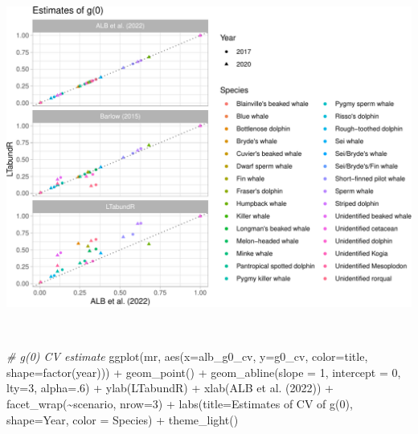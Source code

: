 \documentclass[
]{book}
\newenvironment{Shaded}{\begin{snugshade}}{\end{snugshade}}
\newcommand{\AttributeTok}[1]{\textcolor[rgb]{0.77,0.63,0.00}{#1}}
\newcommand{\CommentTok}[1]{\textcolor[rgb]{0.56,0.35,0.01}{\textit{#1}}}
\newcommand{\DecValTok}[1]{\textcolor[rgb]{0.00,0.00,0.81}{#1}}
\newcommand{\FunctionTok}[1]{\textcolor[rgb]{0.00,0.00,0.00}{#1}}
\newcommand{\NormalTok}[1]{#1}
\newcommand{\SpecialCharTok}[1]{\textcolor[rgb]{0.00,0.00,0.00}{#1}}
\newcommand{\StringTok}[1]{\textcolor[rgb]{0.31,0.60,0.02}{#1}}
\begin{document}
\includegraphics{figures/unnamed-chunk-388-1.pdf}

~

\begin{Shaded}
\begin{Highlighting}[]
\CommentTok{\# g(0) CV estimate}
\FunctionTok{ggplot}\NormalTok{(mr,}
       \FunctionTok{aes}\NormalTok{(}\AttributeTok{x=}\NormalTok{alb\_g0\_cv, }\AttributeTok{y=}\NormalTok{g0\_cv, }
           \AttributeTok{color=}\NormalTok{title, }\AttributeTok{shape=}\FunctionTok{factor}\NormalTok{(year))) }\SpecialCharTok{+}
    \FunctionTok{geom\_point}\NormalTok{() }\SpecialCharTok{+}
    \FunctionTok{geom\_abline}\NormalTok{(}\AttributeTok{slope =} \DecValTok{1}\NormalTok{, }\AttributeTok{intercept =} \DecValTok{0}\NormalTok{, }\AttributeTok{lty=}\DecValTok{3}\NormalTok{, }\AttributeTok{alpha=}\NormalTok{.}\DecValTok{6}\NormalTok{) }\SpecialCharTok{+}
    \FunctionTok{ylab}\NormalTok{(}\StringTok{\textquotesingle{}LTabundR\textquotesingle{}}\NormalTok{) }\SpecialCharTok{+} \FunctionTok{xlab}\NormalTok{(}\StringTok{\textquotesingle{}ALB et al. (2022)\textquotesingle{}}\NormalTok{) }\SpecialCharTok{+}
  \FunctionTok{facet\_wrap}\NormalTok{(}\SpecialCharTok{\textasciitilde{}}\NormalTok{scenario, }\AttributeTok{nrow=}\DecValTok{3}\NormalTok{) }\SpecialCharTok{+} 
  \FunctionTok{labs}\NormalTok{(}\AttributeTok{title=}\StringTok{\textquotesingle{}Estimates of CV of g(0)\textquotesingle{}}\NormalTok{, }
       \AttributeTok{shape=}\StringTok{\textquotesingle{}Year\textquotesingle{}}\NormalTok{, }\AttributeTok{color =} \StringTok{\textquotesingle{}Species\textquotesingle{}}\NormalTok{) }\SpecialCharTok{+} 
  \FunctionTok{theme\_light}\NormalTok{()}
\end{Highlighting}
\end{Shaded}
\end{document}
